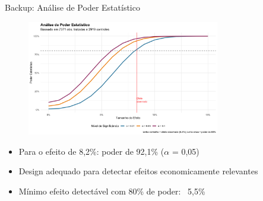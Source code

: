 \documentclass[10pt,aspectratio=169]{beamer}
\begin{document}
\begin{frame}{Backup: Análise de Poder Estatístico}
\begin{figure}
\centering
\includegraphics[width=0.75\textwidth]{../../../data/outputs/additional_figures/power_analysis_simulation.png}
\end{figure}

\begin{itemize}
    \item Para o efeito de 8,2\%: poder de 92,1\% ($\alpha$ = 0,05)
    \item Design adequado para detectar efeitos economicamente relevantes
    \item Mínimo efeito detectável com 80\% de poder: ~5,5\%
\end{itemize}
\end{frame}
\end{document}
